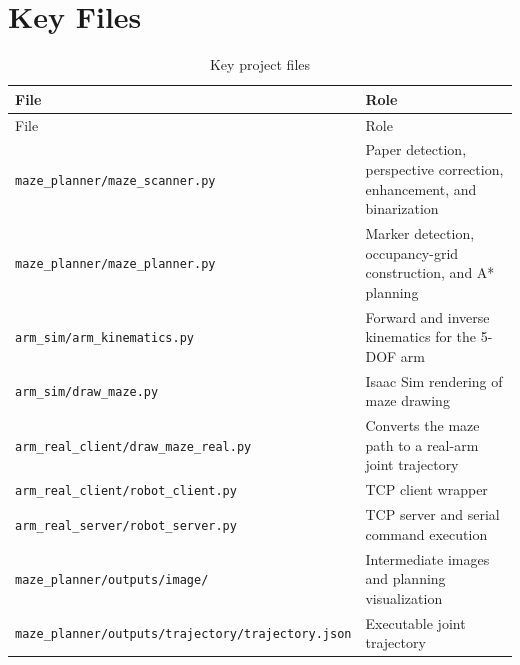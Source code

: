\documentclass[a4paper,12pt]{article}
\begin{document}
\appendix
\section{Key Files}

\begin{longtable}{p{6cm}p{8cm}}
  \caption{Key project files} \\
  \toprule
  File & Role \\
  \midrule
  \endfirsthead
  \toprule
  File & Role \\
  \midrule
  \endhead
  \texttt{maze\_planner/maze\_scanner.py} & Paper detection, perspective correction, enhancement, and binarization \\
  \texttt{maze\_planner/maze\_planner.py} & Marker detection, occupancy-grid construction, and A* planning \\
  \texttt{arm\_sim/arm\_kinematics.py} & Forward and inverse kinematics for the 5-DOF arm \\
  \texttt{arm\_sim/draw\_maze.py} & Isaac Sim rendering of maze drawing \\
  \texttt{arm\_real\_client/draw\_maze\_real.py} & Converts the maze path to a real-arm joint trajectory \\
  \texttt{arm\_real\_client/robot\_client.py} & TCP client wrapper \\
  \texttt{arm\_real\_server/robot\_server.py} & TCP server and serial command execution \\
  \texttt{maze\_planner/outputs/image/} & Intermediate images and planning visualization \\
  \texttt{maze\_planner/outputs/trajectory/trajectory.json} & Executable joint trajectory \\
  \bottomrule
\end{longtable}
\end{document}
